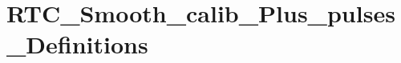 \hypertarget{group___r_t_c___smooth__calib___plus__pulses___definitions}{\section{R\-T\-C\-\_\-\-Smooth\-\_\-calib\-\_\-\-Plus\-\_\-pulses\-\_\-\-Definitions}
\label{group___r_t_c___smooth__calib___plus__pulses___definitions}
}
